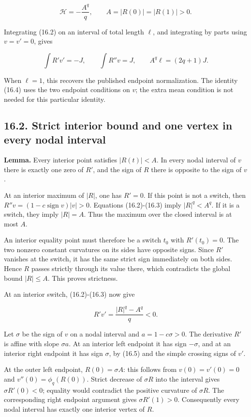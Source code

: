 \documentclass[11pt]{article}
\begin{document}
\[
\mathcal H=-\frac{A^q}{q},\qquad A=|R(0)|=|R(1)|>0.
\tag{16.3}
\]

Integrating (16.2) on an interval of total length \(\ell\), and
integrating by parts using \(v=v'=0\), gives

\[
\int R'v'=-J,\qquad \int R''v=J,
\qquad A^q\ell=(2q+1)J.
\tag{16.4}
\]

When \(\ell=1\), this recovers the published endpoint normalization. The
identity (16.4) uses the two endpoint conditions on \(v\); the extra
mean condition is not needed for this particular identity.

\subsection{16.2. Strict interior bound and one vertex in every nodal
interval}\label{strict-interior-bound-and-one-vertex-in-every-nodal-interval}

\textbf{Lemma.} Every interior point satisfies \(|R(t)|<A\). In every
nodal interval of \(v\) there is exactly one zero of \(R'\), and the
sign of \(R\) there is opposite to the sign of \(v\).

At an interior maximum of \(|R|\), one has \(R'=0\). If this point is
not a switch, then \(R''v=(1-c\operatorname{sign}v)|v|>0\). Equations
(16.2)-(16.3) imply \(|R|^q<A^q\). If it is a switch, they imply
\(|R|=A\). Thus the maximum over the closed interval is at most \(A\).

An interior equality point must therefore be a switch \(t_0\) with
\(R'(t_0)=0\). The two nonzero constant curvatures on its sides have
opposite signs. Since \(R'\) vanishes at the switch, it has the same
strict sign immediately on both sides. Hence \(R\) passes strictly
through its value there, which contradicts the global bound
\(|R|\le A\). This proves strictness.

At an interior switch, (16.2)-(16.3) now give

\[
R'v'=\frac{|R|^q-A^q}{q}<0.
\tag{16.5}
\]

Let \(\sigma\) be the sign of \(v\) on a nodal interval and
\(a=1-c\sigma>0\). The derivative \(R'\) is affine with slope
\(\sigma a\). At an interior left endpoint it has sign \(-\sigma\), and
at an interior right endpoint it has sign \(\sigma\), by (16.5) and the
simple crossing signs of \(v'\).

At the outer left endpoint, \(R(0)=\sigma A\): this follows from
\(v(0)=v'(0)=0\) and \(v''(0)=\phi_q(R(0))\). Strict decrease of
\(\sigma R\) into the interval gives \(\sigma R'(0)<0\); equality would
contradict the positive curvature of \(\sigma R\). The corresponding
right endpoint argument gives \(\sigma R'(1)>0\). Consequently every
nodal interval has exactly one interior vertex of \(R\).
\end{document}
